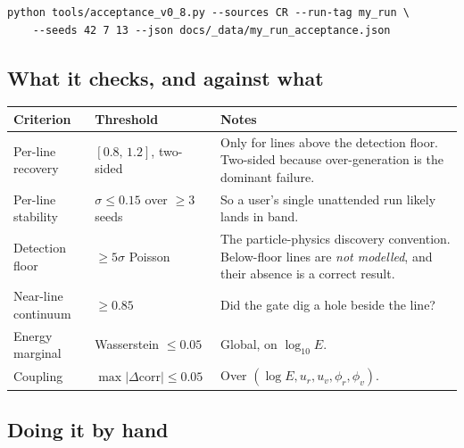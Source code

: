 \documentclass[11pt,a4paper]{article}
\begin{document}
\begin{lstlisting}[language=shell]
python tools/acceptance_v0_8.py --sources CR --run-tag my_run \
    --seeds 42 7 13 --json docs/_data/my_run_acceptance.json
\end{lstlisting}

\subsection{What it checks, and against what}

\begin{center}
\begin{tabular}{@{}p{}p{}p{}@{}}
\toprule
\textbf{Criterion} & \textbf{Threshold} & \textbf{Notes} \\
\midrule
Per-line recovery & $[0.8,\,1.2]$, two-sided &
  Only for lines above the detection floor. Two-sided because
  over-generation is the dominant failure. \\
Per-line stability & $\sigma \leq 0.15$ over $\geq 3$ seeds &
  So a user's single unattended run likely lands in band. \\
Detection floor & $\geq 5\sigma$ Poisson &
  The particle-physics discovery convention. Below-floor lines are
  \emph{not modelled}, and their absence is a correct result. \\
Near-line continuum & $\geq 0.85$ &
  Did the gate dig a hole beside the line? \\
Energy marginal & Wasserstein $\leq 0.05$ &
  Global, on $\log_{10}E$. \\
Coupling & $\max|\Delta\mathrm{corr}| \leq 0.05$ &
  Over $(\log E, u_r, u_v, \phi_r, \phi_v)$. \\
\bottomrule
\end{tabular}
\end{center}

\subsection{Doing it by hand}
\end{document}
